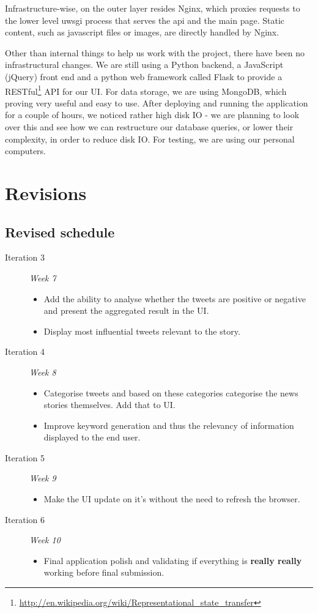 \documentclass[a4paper,12pt]{article}
\begin{document}
	Infrastructure-wise, on the outer layer resides Nginx, which proxies requests to the lower level uwsgi process that serves the api and the main page. Static content, such as javascript files or images, are directly handled by Nginx.
	
	  Other than internal things to help us work with the project, there have been no infrastructural changes. We are still using a Python backend, a JavaScript (jQuery) front end and a python web framework called Flask to provide a RESTful\footnote{\url{http://en.wikipedia.org/wiki/Representational_state_transfer}} API for our UI. For data storage, we are using MongoDB, which proving very useful and easy to use. After deploying and running the application for a couple of hours, we noticed rather high disk IO - we are planning to look over this and see how we can restructure our database queries, or lower their complexity, in order to reduce disk IO. For testing, we are using our personal computers.
	
	\section{Revisions}
	
	\subsection{Revised schedule}
	
	\begin{description}
   \item[Iteration 3] \emph{Week 7}
   \begin{itemize}
     \item Add the ability to analyse whether the tweets are positive or negative and present the aggregated result in the UI.
     \item Display most influential tweets relevant to the story.
   \end{itemize}
   \item[Iteration 4] \emph{Week 8}
   \begin{itemize}
     \item Categorise tweets and based on these categories categorise the news stories themselves. Add that to UI.
     \item Improve keyword generation and thus the relevancy of information displayed to the end user.
   \end{itemize}
   \item[Iteration 5] \emph{Week 9}
   \begin{itemize}
     \item Make the UI update on it's without the need to refresh the browser.
   \end{itemize}
   \item[Iteration 6] \emph{Week 10}
   \begin{itemize}
     \item Final application polish and validating if everything is \textbf{really really} working before final submission.
   \end{itemize}
  \end{description}
  
\end{document}

